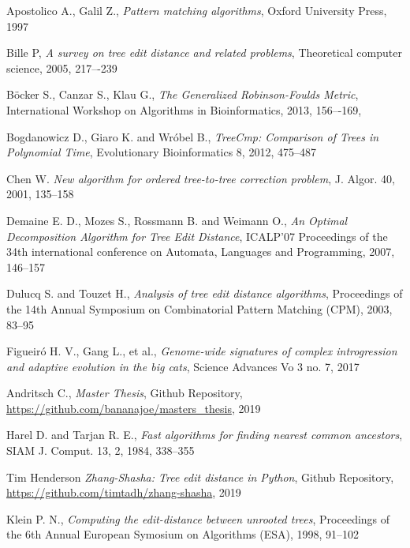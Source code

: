 \begin{thebibliography}{99}

  Apostolico A., Galil Z.,
  \textit{Pattern matching algorithms},
  Oxford University Press,
  1997
  
  Bille P,
  \textit{A survey on tree edit distance and related problems},
  Theoretical computer science,
  2005,
  217–-239
  
  Böcker S., Canzar S., Klau G.,
  \textit{The Generalized Robinson-Foulds Metric},
  International Workshop on Algorithms in Bioinformatics,
  2013,
  156–-169,
  
  Bogdanowicz D., Giaro K. and Wróbel B.,
  \textit{TreeCmp: Comparison of Trees in Polynomial Time},
  Evolutionary Bioinformatics 8,
  2012,
  475--487
   
  Chen W.
  \textit{New algorithm for ordered tree-to-tree correction problem},
  J. Algor. 40,
  2001,
  135--158
  
  Demaine E. D., Mozes S., Rossmann B. and Weimann O.,
  \textit{An Optimal Decomposition Algorithm for Tree Edit Distance},
  ICALP'07 Proceedings of the 34th international conference on Automata, Languages and Programming,
  2007,
  146--157

  Dulucq S. and Touzet H.,
  \textit{Analysis of tree edit distance algorithms},
  Proceedings of the 14th Annual Symposium on Combinatorial Pattern Matching (CPM),
  2003,
  83--95
  
  Figueiró H. V., Gang L., et al.,
  \textit{Genome-wide signatures of complex introgression and adaptive evolution in the big cats},
  Science Advances Vo 3 no. 7,
  2017
  
  Andritsch C.,
  \textit{Master Thesis},
  Github Repository,
  \url{https://github.com/bananajoe/masters_thesis},
  2019
  
  Harel D. and Tarjan R. E.,
  \textit{Fast algorithms for finding nearest common ancestors},
  SIAM J. Comput. 13, 2,
  1984,
  338--355
  
  Tim Henderson
  \textit{Zhang-Shasha: Tree edit distance in Python},
  Github Repository,
  \url{https://github.com/timtadh/zhang-shasha},
  2019
  
  Klein P. N.,
  \textit{Computing the edit-distance between unrooted trees}, 
  Proceedings of the 6th Annual European Symosium on Algorithms (ESA),
  1998,
  91--102
  

\end{thebibliography}
